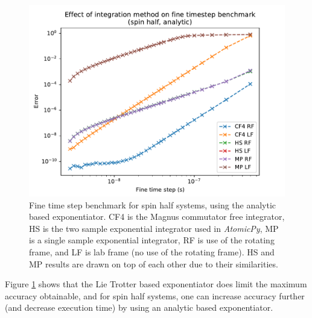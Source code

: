 \documentclass{jors}
\begin{document}
			\begin{figure}[h!]
				\includegraphics[scale=0.9]{benchmark_comparison_spin_half_a_publication.pdf}
				\caption{Fine time step benchmark for spin half systems, using the analytic based exponentiator. CF4 is the Magnus commutator free integrator, HS is the two sample exponential integrator used in \emph{AtomicPy}, MP is a single sample exponential integrator, RF is use of the rotating frame, and LF is lab frame (no use of the rotating frame). HS and MP results are drawn on top of each other due to their similarities.}
				\label{fig:benchmark_comparison_spin_half_a}
			\end{figure}

			Figure \ref{fig:benchmark_comparison_spin_half_a} shows that the Lie Trotter based exponentiator does limit the maximum accuracy obtainable, and for spin half systems, one can increase accuracy further (and decrease execution time) by using an analytic based exponentiator.
\end{document}
